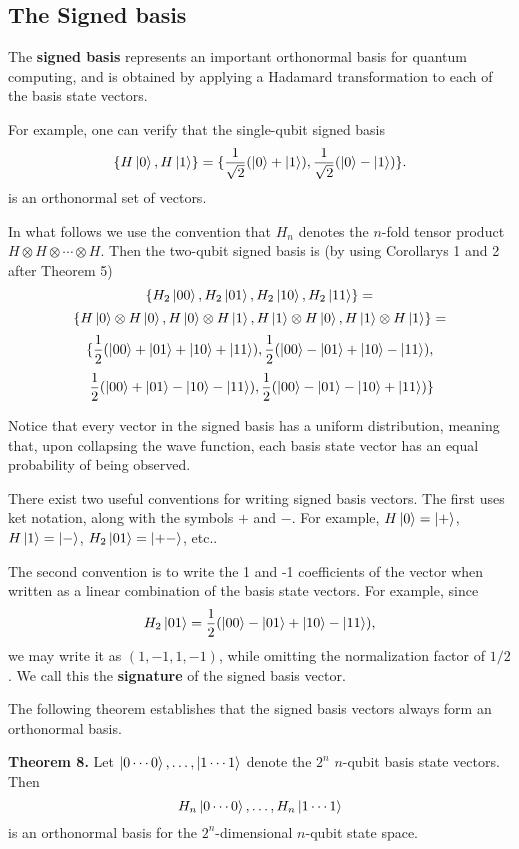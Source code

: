 \documentclass [12pt]{article}
\theoremstyle{definition}
\begin{document}
\subsection*{The Signed basis}

The \textbf{signed basis} represents
an important orthonormal basis for quantum computing, and is obtained by applying a Hadamard transformation to each of the 
basis state vectors. 

For example, one can verify that the single-qubit signed basis 
\[\{H\ket{0},H\ket{1}\} = \{\frac{1}{\sqrt{2}}(\ket{0}+\ket{1}),\frac{1}{\sqrt{2}}(\ket{0}-\ket{1})\}.\]
is an orthonormal set of vectors. 

In what follows we use the convention that $H_n$ denotes the $n$-fold tensor product $H\otimes H\otimes\cdots \otimes H$.
Then the two-qubit signed basis is (by using Corollarys 1 and 2 after Theorem 5)
\[\{H_2\ket{00},H_2\ket{01}, H_2\ket{10}, H_2\ket{11}\} =\]
\[ \{H\ket{0}\otimes H\ket{0}, H\ket{0}\otimes H\ket{1},
H\ket{1}\otimes H\ket{0},H\ket{1}\otimes H\ket{1}\} =\]
\[\{\frac{1}{2}(\ket{00} + \ket{01} + \ket{10} + \ket{11}), \frac{1}{2}(\ket{00} - \ket{01} + \ket{10} - \ket{11}),\]
\[\mbox{    }\frac{1}{2}(\ket{00} + \ket{01} - \ket{10} - \ket{11}), \frac{1}{2}(\ket{00} - \ket{01} - \ket{10} + \ket{11})\}\]

Notice that every vector in the signed basis has a  uniform distribution, meaning that, upon collapsing the wave function,
 each basis state vector has an equal probability of being observed.
 
There exist two useful conventions for writing signed basis vectors. The first uses ket notation, along with the symbols $+$ and $-$.
For example, $H\ket{0}=\ket{+}$, $H\ket{1}=\ket{-}$, $H_2\ket{01}=\ket{+-}$, etc..

The second convention is to write the 1 and -1 coefficients of the vector when written as a linear combination of the basis state vectors.
For example,  since 
\[ H_2\ket{01} =  \frac{1}{2}(\ket{00} - \ket{01} + \ket{10} - \ket{11}),\]
we may write it as $(1,-1,1,-1)$, while omitting the normalization factor of $1/2$. We call this the \textbf{signature} of the signed basis vector.

The following theorem establishes that the signed basis vectors always form an orthonormal basis.

\textbf{Theorem 8.} Let $\ket{0\cdots 0},\ldots,\ket{1\cdots 1}$ denote the $2^{n}$ $n$-qubit basis state vectors. Then 
\[H_n\ket{0\cdots 0}, \ldots, H_n\ket{1\cdots 1}\]
is an orthonormal basis for the $2^n$-dimensional $n$-qubit state space.
\end{document}
